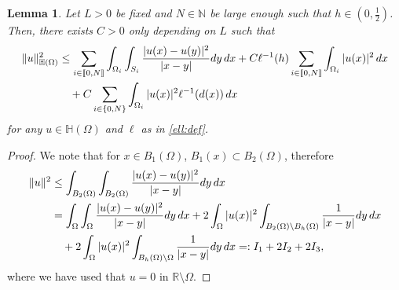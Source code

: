 \documentclass[10 pt]{article}
\newcommand\inter[1]{\llbracket #1\rrbracket}
\newtheorem{lemma}[theorem]{Lemma}
\numberwithin{equation}{section}
\def\R{\mathbb{R}}
\begin{document}
\begin{lemma}\label{lem:localization_enorm}
Let $L>0$ be fixed and $N\in\mathbb N$ be large enough such that $h\in(0,\frac{1}{2})$. Then, there exists $C>0$ only depending on $L$ such that 
%
   \begin{align*}\notag
    \|u\|^2_{\mathbb H(\Omega)} &\leq \sum_{i\in\inter{0,N}}\int_{\Omega_i}\int_{S_i}\frac{|u(x)-u(y)|^2}{|x-y|}dy\,dx+C\ell^{-1}(h)\sum_{i\in\inter{0,N}}\int_{\Omega_i}|u(x)|^2\,dx\\
    &\quad +C\sum_{i\in\{0,N\}}\int_{\Omega_i}|u(x)|^2\ell^{-1}(d(x))\,dx
\end{align*}
%
for any $u\in \mathbb{H}(\Omega)$ and $\ell$ as in \eqref{ell:def}.
\end{lemma}
\begin{proof}
We note that for $x\in B_1(\Omega)$, $B_1(x)\subset B_2(\Omega)$, therefore
%
\begin{align}\notag
    \|u\|^2&\leq \int_{B_2(\Omega)}\int_{B_2(\Omega)}\frac{|u(x)-u(y)|^2}{|x-y|}dy\, dx\\ \notag
    &=\int_{\Omega}\int_{\Omega}\frac{|u(x)-u(y)|^2}{|x-y|}dy\,dx+2\int_{\Omega}|u(x)|^2\int_{B_2(\Omega)\setminus B_h(\Omega)}\frac{1}{|x-y|}dy\,dx \\ \label{eq:part_init}
    &\quad +2\int_{\Omega}|u(x)|^2\int_{B_h(\Omega)\setminus \Omega}\frac{1}{|x-y|}dy\,dx =: I_1+2I_2+2I_3,
\end{align}
%
where we have used that $u=0$ in $\R\setminus \Omega$. 


\end{proof}
\end{document}
